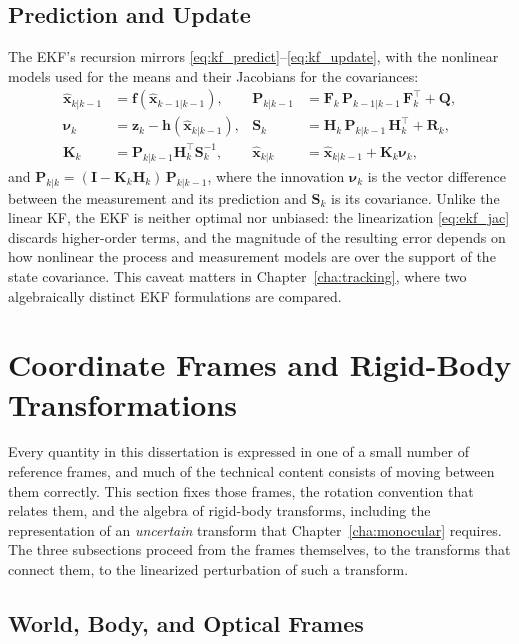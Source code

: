 \subsection{Prediction and Update}

The EKF's recursion mirrors \eqref{eq:kf_predict}--\eqref{eq:kf_update}, with the
nonlinear models used for the means and their Jacobians for the covariances:
\begin{align}
  \hat{\bm{x}}_{k|k-1} &= \bm{f}(\hat{\bm{x}}_{k-1|k-1}), &
  \bm{P}_{k|k-1} &= \bm{F}_k\,\bm{P}_{k-1|k-1}\,\bm{F}_k^{\top} + \bm{Q}, \label{eq:ekf_predict}\\
  \bm{\nu}_k &= \bm{z}_k - \bm{h}(\hat{\bm{x}}_{k|k-1}), &
  \bm{S}_k &= \bm{H}_k\,\bm{P}_{k|k-1}\,\bm{H}_k^{\top} + \bm{R}_k, \label{eq:ekf_innov}\\
  \bm{K}_k &= \bm{P}_{k|k-1}\bm{H}_k^{\top}\bm{S}_k^{-1}, &
  \hat{\bm{x}}_{k|k} &= \hat{\bm{x}}_{k|k-1} + \bm{K}_k\bm{\nu}_k, \label{eq:ekf_gain}
\end{align}
and $\bm{P}_{k|k} = (\bm{I}-\bm{K}_k\bm{H}_k)\,\bm{P}_{k|k-1}$, where the
innovation $\bm{\nu}_k$ is the vector difference between the measurement and its
prediction and $\bm{S}_k$ is its covariance. Unlike the linear
KF, the EKF is neither optimal nor unbiased: the linearization
\eqref{eq:ekf_jac} discards higher-order terms, and the magnitude of the
resulting error depends on how nonlinear the process and measurement models are
over the support of the state covariance. This caveat matters in Chapter~\ref{cha:tracking}, where two
algebraically distinct EKF formulations are compared.

\section{Coordinate Frames and Rigid-Body Transformations}

Every quantity in this dissertation is expressed in one of a small number of
reference frames, and much of the technical content consists of moving between
them correctly. This section fixes those frames, the rotation convention that
relates them, and the algebra of rigid-body transforms, including the
representation of an \emph{uncertain} transform that Chapter~\ref{cha:monocular}
requires. The three subsections proceed from the frames themselves, to the
transforms that connect them, to the linearized perturbation of such a transform.

\subsection{World, Body, and Optical Frames}

